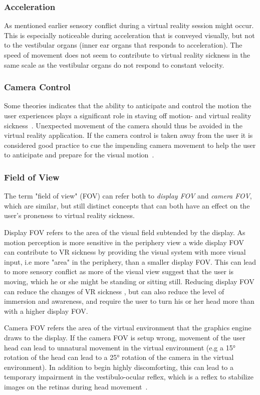 \subsubsection{Acceleration}
As mentioned earlier sensory conflict during a virtual reality session might occur. This is especially noticeable during acceleration that is conveyed visually, but 
not to the vestibular organs (inner ear organs that responds to acceleration). The speed of movement does not seem to contribute to virtual reality sickness in the same scale
as the vestibular organs do not respond to constant velocity. %

\subsubsection{Camera Control}
Some theories indicates that the ability to anticipate and control the motion the user experiences plays a significant role in staving off motion- 
and virtual reality sickness~\citep{Rolnick1991}. Unexpected movement of the camera should thus be avoided in the virtual reality application. 
If the camera control is taken away from the user it is considered good practice to cue the impending camera movement to help the user to anticipate and prepare for 
the visual motion~\citep{Lin2004}.

\subsubsection{Field of View}
The term "field of view" (FOV) can refer both to \textit{display FOV} and \textit{camera FOV}, which are similar, 
but still distinct concepts that can both have an effect on the user's proneness to virtual reality sickness. 

Display FOV refers to the area of the visual field subtended by the display. As motion perception is more sensitive in the periphery view 
a wide display FOV can contribute to VR sickness by providing the visual system with more visual input, i.e more "area" in the periphery, than a smaller display FOV. 
This can lead to more sensory conflict as more of the visual view suggest that the user is moving, which he or she might be standing or sitting still.
Reducing display FOV can reduce the changes of VR sickness \citep{Draper2001}, but can also reduce the level of immersion and awareness, and require the user to turn his or her head more
than with a higher display FOV.

Camera FOV refers the area of the virtual environment that the graphics engine draws to the display.
If the camera FOV is setup wrong, movement of the user head can lead to unnatural movement in the virtual environment (e.g a 15° rotation of the head can lead to a 
25° rotation of the camera in the virtual environment). In addition to begin highly discomforting, this can lead to a temporary impairment in the vestibulo-ocular reflex, 
which is a reflex to stabilize images on the retinas during head movement~\citep{Stanney2002}.

